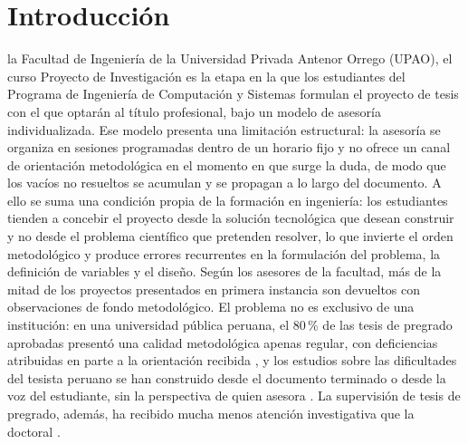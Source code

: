 \documentclass[journal]{IEEEtran}
\begin{document}
\section{Introducción}

 la Facultad de Ingeniería de la Universidad Privada Antenor Orrego (UPAO), el curso Proyecto de Investigación es la etapa en la que los estudiantes del Programa de Ingeniería de Computación y Sistemas formulan el proyecto de tesis con el que optarán al título profesional, bajo un modelo de asesoría individualizada. Ese modelo presenta una limitación estructural: la asesoría se organiza en sesiones programadas dentro de un horario fijo y no ofrece un canal de orientación metodológica en el momento en que surge la duda, de modo que los vacíos no resueltos se acumulan y se propagan a lo largo del documento. A ello se suma una condición propia de la formación en ingeniería: los estudiantes tienden a concebir el proyecto desde la solución tecnológica que desean construir y no desde el problema científico que pretenden resolver, lo que invierte el orden metodológico y produce errores recurrentes en la formulación del problema, la definición de variables y el diseño. Según los asesores de la facultad, más de la mitad de los proyectos presentados en primera instancia son devueltos con observaciones de fondo metodológico. El problema no es exclusivo de una institución: en una universidad pública peruana, el 80\,\% de las tesis de pregrado aprobadas presentó una calidad metodológica apenas regular, con deficiencias atribuidas en parte a la orientación recibida \cite{estrada2022}, y los estudios sobre las dificultades del tesista peruano se han construido desde el documento terminado o desde la voz del estudiante, sin la perspectiva de quien asesora \cite{perdomo2022,vilca2023}. La supervisión de tesis de pregrado, además, ha recibido mucha menos atención investigativa que la doctoral \cite{agricola2021}.
\end{document}
